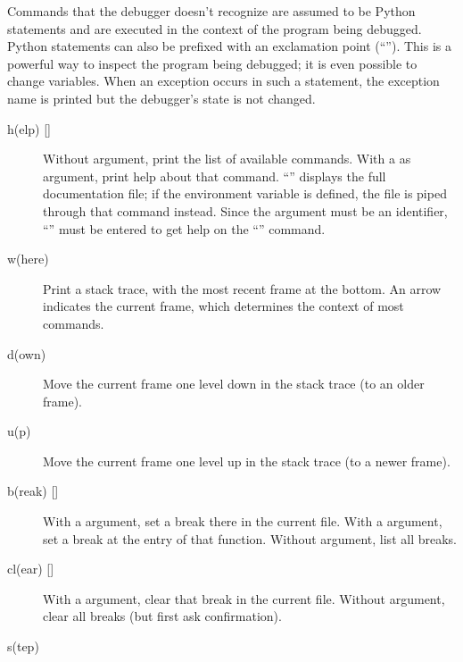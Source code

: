 Commands that the debugger doesn't recognize are assumed to be Python
statements and are executed in the context of the program being
debugged.  Python statements can also be prefixed with an exclamation
point (``\code{!}'').  This is a powerful way to inspect the program
being debugged; it is even possible to change variables.  When an
exception occurs in such a statement, the exception name is printed
but the debugger's state is not changed.

\begin{description}

\item[{h(elp) []}]

Without argument, print the list of available commands.
With a  as argument, print help about that command.
``'' displays the full documentation file; if the
environment variable  is defined, the file is piped
through that command instead.  Since the  argument must be
an identifier, ``'' must be entered to get help on the
``\code{!}'' command.

\item[{w(here)}]

Print a stack trace, with the most recent frame at the bottom.
An arrow indicates the current frame, which determines the
context of most commands.

\item[{d(own)}]

Move the current frame one level down in the stack trace
(to an older frame).

\item[{u(p)}]

Move the current frame one level up in the stack trace
(to a newer frame).

\item[{b(reak) [\code{|}]}]

With a  argument, set a break there in the current
file.  With a  argument, set a break at the entry of
that function.  Without argument, list all breaks.

\item[{cl(ear) []}]

With a  argument, clear that break in the current file.
Without argument, clear all breaks (but first ask confirmation).

\item[{s(tep)}]


\end{description}
